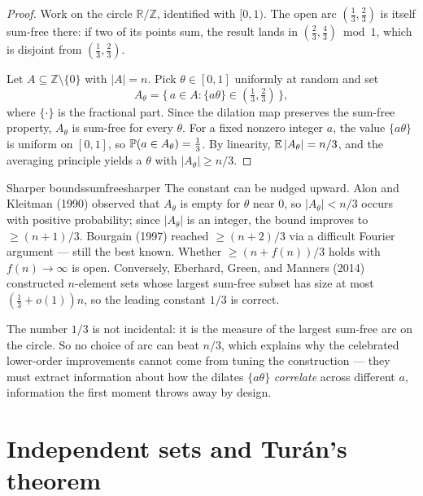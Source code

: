 \begin{proof}
Work on the circle $\mathbb{R}/\mathbb{Z}$, identified with $[0,1)$. The open
arc $(\tfrac13,\tfrac23)$ is itself sum-free there: if two of its points sum,
the result lands in $(\tfrac23,\tfrac43)\bmod 1$, which is disjoint from
$(\tfrac13,\tfrac23)$.

Let $A\subseteq\mathbb{Z}\setminus\{0\}$ with $|A|=n$. Pick $\theta\in[0,1]$
uniformly at random and set
\[
  A_\theta = \bigl\{\,a\in A : \{a\theta\}\in(\tfrac13,\tfrac23)\,\bigr\},
\]
where $\{\cdot\}$ is the fractional part. Since the dilation map preserves the
sum-free property, $A_\theta$ is sum-free for every $\theta$. For a fixed
nonzero integer $a$, the value $\{a\theta\}$ is uniform on $[0,1]$, so
$\mathbb{P}(a\in A_\theta)=\tfrac13$. By linearity, $\mathbb{E}\,|A_\theta|=n/3$, and the
averaging principle yields a $\theta$ with $|A_\theta|\ge n/3$.
\end{proof}

\begin{remark}{Sharper bounds}{sumfreesharper}
The constant can be nudged upward. Alon and Kleitman (1990) observed that
$A_\theta$ is empty for $\theta$ near $0$, so $|A_\theta|<n/3$ occurs with
positive probability; since $|A_\theta|$ is an integer, the bound improves to
$\ge(n+1)/3$. Bourgain (1997) reached $\ge(n+2)/3$ via a difficult Fourier
argument --- still the best known. Whether $\ge(n+f(n))/3$ holds with
$f(n)\to\infty$ is open. Conversely, Eberhard, Green, and Manners (2014)
constructed $n$-element sets whose largest sum-free subset has size at most
$(\tfrac13+o(1))n$, so the leading constant $1/3$ is correct.
\end{remark}

\begin{insight}
The number $1/3$ is not incidental: it is the measure of the largest sum-free
arc on the circle. So no choice of arc can beat $n/3$, which explains why the
celebrated lower-order improvements cannot come from tuning the construction
--- they must extract information about how the dilates $\{a\theta\}$
\emph{correlate} across different $a$, information the first moment throws
away by design.
\end{insight}

\section{Independent sets and Tur\'an's theorem}

